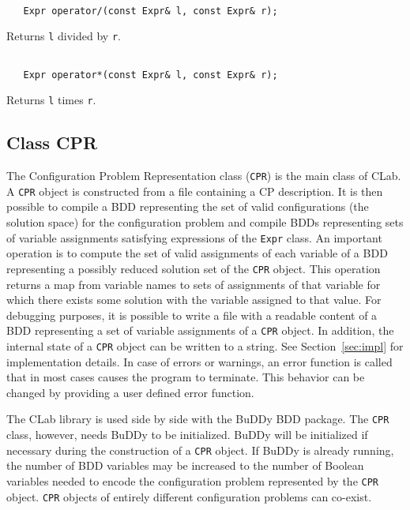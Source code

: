 \documentclass{article}
\begin{document}
\noindent
\hrulefill

\begin{verbatim}

   Expr operator/(const Expr& l, const Expr& r);

\end{verbatim}
Returns \texttt{l} divided by \texttt{r}.

\noindent
\hrulefill

\begin{verbatim}

   Expr operator*(const Expr& l, const Expr& r);

\end{verbatim}
Returns \texttt{l} times \texttt{r}.


\subsection{Class CPR}

The Configuration Problem Representation class (\texttt{CPR}) is the
main class of CLab. A \texttt{CPR} object is constructed from a file
containing a CP description.  It is then possible to compile a BDD
representing the set of valid configurations (the solution space) for
the configuration problem and compile BDDs representing sets of
variable assignments satisfying expressions of the \texttt{Expr}
class. An important operation is to compute the set of valid
assignments of each variable of a BDD representing a possibly
reduced solution set of the \texttt{CPR} object. This operation
returns a map from variable names to sets of assignments of that
variable for which there exists some solution with the variable
assigned to that value. For debugging purposes, it is possible to
write a file with a readable content of a BDD representing a set of
variable assignments of a \texttt{CPR} object. In addition, the
internal state of a \texttt{CPR} object can be written to a
string. See Section~\ref{sec:impl} for implementation details. In case
of errors or warnings, an error function is called that in most cases
causes the program to terminate. This behavior can be changed by
providing a user defined error function.

The CLab library is used side by side with the BuDDy BDD package. The
\texttt{CPR} class, however, needs BuDDy to be initialized. BuDDy
will be initialized if necessary during the construction of a
\texttt{CPR} object. If BuDDy is already running, the 
number of BDD variables may be increased to the number of Boolean
variables needed to encode the configuration problem represented by
the \texttt{CPR} object. \texttt{CPR} objects of entirely different
configuration problems can co-exist.
\end{document}
